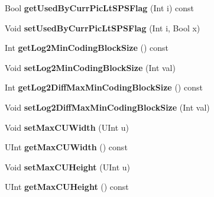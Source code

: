 \begin{DoxyCompactItemize}
\item 
\mbox{\label{class_t_com_s_p_s_a30ecc2b165b7976dd3812a8a5b343597}} 
Bool {\bfseries get\+Used\+By\+Curr\+Pic\+Lt\+S\+P\+S\+Flag} (Int i) const
\item 
\mbox{\label{class_t_com_s_p_s_a2978bb4216c81690da7bf69051a73ccf}} 
Void {\bfseries set\+Used\+By\+Curr\+Pic\+Lt\+S\+P\+S\+Flag} (Int i, Bool x)
\item 
\mbox{\label{class_t_com_s_p_s_ae5cb42ae3559d313d64a193022a80b8e}} 
Int {\bfseries get\+Log2\+Min\+Coding\+Block\+Size} () const
\item 
\mbox{\label{class_t_com_s_p_s_afc9801150a170e891df7e81eb9bdccec}} 
Void {\bfseries set\+Log2\+Min\+Coding\+Block\+Size} (Int val)
\item 
\mbox{\label{class_t_com_s_p_s_ad446b6253a31ecd562b327b761ce57f8}} 
Int {\bfseries get\+Log2\+Diff\+Max\+Min\+Coding\+Block\+Size} () const
\item 
\mbox{\label{class_t_com_s_p_s_a654cb2df8e7a92ff3d931f58c00c17eb}} 
Void {\bfseries set\+Log2\+Diff\+Max\+Min\+Coding\+Block\+Size} (Int val)
\item 
\mbox{\label{class_t_com_s_p_s_afc5b980f5424c9deb17bdc4c8404f904}} 
Void {\bfseries set\+Max\+C\+U\+Width} (U\+Int u)
\item 
\mbox{\label{class_t_com_s_p_s_a78357c2b0f16ef23cea90f469c2992b2}} 
U\+Int {\bfseries get\+Max\+C\+U\+Width} () const
\item 
\mbox{\label{class_t_com_s_p_s_a81f882d7d20b2c5316e3cf601b860fd6}} 
Void {\bfseries set\+Max\+C\+U\+Height} (U\+Int u)
\item 
\mbox{\label{class_t_com_s_p_s_a1189453580eba1ea7b585132dd8070ed}} 
U\+Int {\bfseries get\+Max\+C\+U\+Height} () const
\item 
\mbox{\label{class_t_com_s_p_s_a20fb32ee272b28ba27f9fdd233b6dacf}} 

\end{DoxyCompactItemize}

